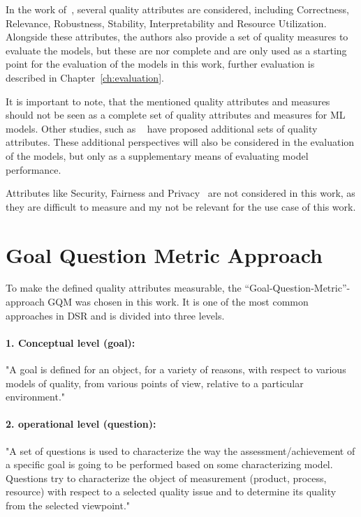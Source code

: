 In the work of~\cite{siebert2022construction}, several quality attributes are considered, including
Correctness, Relevance, Robustness, Stability, Interpretability and Resource
Utilization.
Alongside these attributes, the authors also provide a set of quality measures to evaluate the
models, but these are nor complete and are only used as a starting point for the evaluation of the
models in this work, further evaluation is described in Chapter~\ref{ch:evaluation}.

It is important to note, that the mentioned quality attributes and measures should
not be seen as a complete set of quality attributes and measures for \ac{ML} models.
Other studies, such as ~\cite{zhang2020machine} have proposed additional sets of quality attributes.
These additional perspectives will also be considered in the evaluation of the models, but only
as a supplementary means of evaluating model performance.

Attributes like Security, Fairness and Privacy~\cite[p. 3]{zhang2020machine} are not considered in
this work, as they are difficult to measure and my not be relevant for the use case of this work.


\section{Goal Question Metric Approach}\label{subsec:goal-question-metric-approach}
To make the defined quality attributes measurable, the “Goal-Question-Metric”-approach \ac{GQM}
was chosen in this work. It is one of the most common approaches in DSR and is divided into three
levels.
\cite[p. 3]{basili_goalquestionmetric_}

\paragraph{1. Conceptual level (goal):}
"A goal is defined for an object, for a variety of reasons,
with respect to various models of quality, from various points of view, relative to a
particular environment." \cite[p. 3]{basili_goalquestionmetric_}

\paragraph{2. operational level (question):}
"A set of questions is used to characterize the way
the assessment/achievement of a specific goal is going to be performed based on
some characterizing model. Questions try to characterize the object of
measurement (product, process, resource) with respect to a selected quality issue
and to determine its quality from the selected viewpoint." \cite[p. 3]{basili_goalquestionmetric_}

